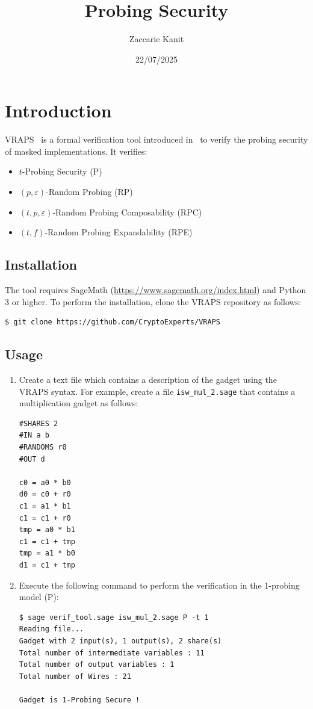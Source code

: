 \documentclass{article}
\author{Zaccarie Kanit}
\date{22/07/2025}
\title{Probing Security}
\begin{document}
\maketitle

\section*{Introduction}

VRAPS~\cite{vraps} is a formal verification tool introduced in~\cite{DBLP:conf/crypto/BelaidCPRT20} to verify the probing security of masked implementations. It verifies:

\begin{itemize}
\item $t$-Probing Security (P)
\item $(p, \varepsilon)$-Random Probing (RP)
\item $(t, p, \varepsilon)$-Random Probing Composability (RPC)
\item $(t, f)$-Random Probing Expandability (RPE)
\end{itemize}

\subsection*{Installation}

The tool requires SageMath (\url{https://www.sagemath.org/index.html}) and Python 3 or higher. To perform the installation, clone the VRAPS repository as follows:

\begin{verbatim}
$ git clone https://github.com/CryptoExperts/VRAPS
\end{verbatim}

\subsection*{Usage}\label{sec:usage}
\begin{enumerate}
\item Create a text file which contains a description of the gadget using the VRAPS syntax. For example, create a file \texttt{isw\_mul\_2.sage} that contains a multiplication gadget as follows:  
\begin{verbatim}
#SHARES 2
#IN a b
#RANDOMS r0
#OUT d

c0 = a0 * b0	
d0 = c0 + r0
c1 = a1 * b1
c1 = c1 + r0
tmp = a0 * b1
c1 = c1 + tmp
tmp = a1 * b0
d1 = c1 + tmp
\end{verbatim}
\item Execute the following command to perform the verification in the 1-probing model (P):
\begin{verbatim}
$ sage verif_tool.sage isw_mul_2.sage P -t 1
Reading file...
Gadget with 2 input(s), 1 output(s), 2 share(s)
Total number of intermediate variables : 11
Total number of output variables : 1
Total number of Wires : 21

Gadget is 1-Probing Secure !
\end{verbatim}
\end{enumerate}
\end{document}
